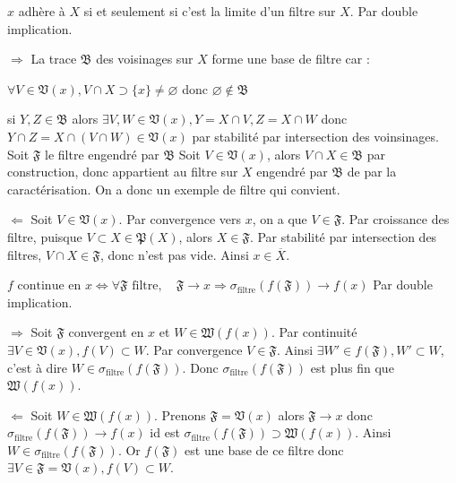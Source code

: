 \documentclass[a4paper, 11pt, french]{book}
\newenvironment{itemise}{\itemize}{\enditemize}
\theoremstyle{plain} %
\theoremstyle{definition} %
\theoremstyle{remark} %
\newcommand{\1}{\mathds{1}}
\newcommand\vide{\varnothing}
\begin{document}
\proposition
$x$ adhère à $X$ si et seulement si c'est la limite d'un filtre sur $X$.
\demonstration
Par double implication.
\begin{itemise}
	\item[$\Rightarrow$] La trace $\mathfrak{B}$ des voisinages sur $X$ forme une base de filtre car :
	\begin{itemise}
		\item $\forall V\in\mathfrak{V}(x), V\cap X\supset\{x\}\neq\vide$ donc $\vide\notin\mathfrak{B}$
		\item si $Y, Z\in\mathfrak{B}$ alors $\exists V, W\in\mathfrak{V}(x), Y=X\cap V, Z=X\cap W$ donc $Y\cap Z=X\cap(V\cap W)\in\mathfrak{V}(x)$ par stabilité par intersection des voinsinages.
	\end{itemise}
	Soit $\mathfrak{F}$ le filtre engendré par $\mathfrak{B}$
	Soit $V\in\mathfrak{V}(x)$, alors $V\cap X\in\mathfrak{B}$ par construction, donc appartient au filtre sur $X$ engendré par $\mathfrak{B}$ de par la caractérisation.
	On a donc un exemple de filtre qui convient.
	\item[$\Leftarrow$] Soit $V\in\mathfrak{V}(x)$.
	Par convergence vers $x$, on a que $V\in\mathfrak{F}$.
	Par croissance des filtre, puisque $V\subset X\in\mathfrak{P}(X)$, alors $X\in\mathfrak{F}$.
	Par stabilité par intersection des filtres, $V\cap X\in\mathfrak{F}$, donc n'est pas vide.
	Ainsi $x\in\overline{X}$.
\end{itemise}

\proposition
$f\text{ continue en }x\iff\forall\mathfrak{F}\text{ filtre},\quad\mathfrak{F}\rightarrow x\Rightarrow\sigma_\text{filtre}(f(\mathfrak{F}))\rightarrow f(x)$
\demonstration Par double implication.
\begin{itemise}
	\item[$\Rightarrow$] Soit $\mathfrak{F}$ convergent en $x$ et $W\in\mathfrak{W}(f(x))$.
	Par continuité $\exists V\in\mathfrak{V}(x), f(V)\subset W$.
	Par convergence $V\in\mathfrak{F}$.
	Ainsi $\exists W'\in f(\mathfrak{F}), W'\subset W$, c'est à dire $W\in\sigma_\text{filtre}(f(\mathfrak{F}))$.
	Donc $\sigma_\text{filtre}(f(\mathfrak{F}))$ est plus fin que $\mathfrak{W}(f(x))$.
	\item[$\Leftarrow$] Soit $W\in\mathfrak{W}(f(x))$.
	Prenons $\mathfrak{F}=\mathfrak{V}(x)$ alors $\mathfrak{F}\rightarrow x$ donc $\sigma_\text{filtre}(f(\mathfrak{F}))\rightarrow f(x)$ id est $\sigma_\text{filtre}(f(\mathfrak{F}))\supset\mathfrak{W}(f(x))$.
	Ainsi $W\in\sigma_\text{filtre}(f(\mathfrak{F}))$.
	Or $f(\mathfrak{F})$ est une base de ce filtre donc $\exists V\in\mathfrak{F}=\mathfrak{V}(x), f(V)\subset W$.
\end{itemise}
\end{document}
